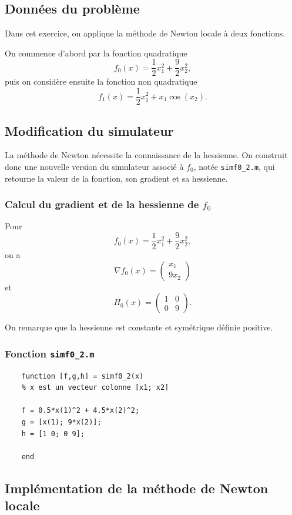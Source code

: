 \documentclass[a4paper,12pt]{article}
\begin{document}
	\subsection{Données du problème}
	
	Dans cet exercice, on applique la méthode de Newton locale à deux fonctions.
	
	On commence d’abord par la fonction quadratique
	\[
	f_0(x)=\frac12 x_1^2+\frac92 x_2^2,
	\]
	puis on considère ensuite la fonction non quadratique
	\[
	f_1(x)=\frac12 x_1^2+x_1\cos(x_2).
	\]
	
	\subsection{Modification du simulateur}
	
	La méthode de Newton nécessite la connaissance de la hessienne. On construit donc une nouvelle version du simulateur associé à \(f_0\), notée \texttt{simf0\_2.m}, qui retourne la valeur de la fonction, son gradient et sa hessienne.
	
	\subsubsection{Calcul du gradient et de la hessienne de \(f_0\)}
	
	Pour
	\[
	f_0(x)=\frac12 x_1^2+\frac92 x_2^2,
	\]
	on a
	\[
	\nabla f_0(x)=
	\begin{pmatrix}
	x_1\\
	9x_2
	\end{pmatrix}
	\]
	et
	\[
	H_0(x)=
	\begin{pmatrix}
	1&0\\
	0&9
	\end{pmatrix}.
	\]
	
	On remarque que la hessienne est constante et symétrique définie positive.
	
	\subsubsection{Fonction \texttt{simf0\_2.m}}
	
	\begin{verbatim}
	function [f,g,h] = simf0_2(x)
	% x est un vecteur colonne [x1; x2]
	
	f = 0.5*x(1)^2 + 4.5*x(2)^2;
	g = [x(1); 9*x(2)];
	h = [1 0; 0 9];
	
	end
	\end{verbatim}
	
	\subsection{Implémentation de la méthode de Newton locale}
	
\end{document}
